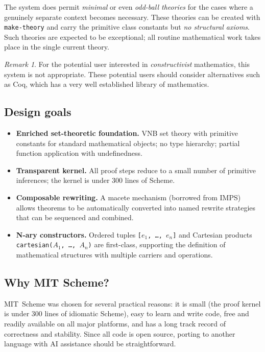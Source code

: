 \documentclass{amsbook}[openany]
\theoremstyle{definition}
\theoremstyle{remark}
\newtheorem{remark}{Remark}[chapter]
\theoremstyle{remark}
\begin{document}
The system does permit \emph{minimal} or even \emph{odd-ball theories}
for the cases where a genuinely separate context becomes necessary.
These theories can be created with \texttt{make-theory} and carry
the primitive class constants but \emph{no structural axioms}.  Such
theories are expected to be exceptional; all routine mathematical work
takes place in the single current theory.

\begin{remark}\label{remark:27137-61828-986360}
%
For the potential user interested in \emph{constructivist} mathematics,
this system is not appropriate. These potential users should consider
alternatives such as Coq, which has a very well established library of
mathematics.
%
\end{remark}

\subsection{Design goals}

\begin{itemize}[ label = $\circ$, leftmargin = 1cm]
\item \textbf{Enriched set-theoretic foundation.}  VNB set theory with
  primitive constants for standard mathematical objects; no type
  hierarchy; partial function application with undefinedness.
\item \textbf{Transparent kernel.}  All proof steps reduce to a small
number of
  primitive inferences; the kernel is under 300 lines of Scheme.
\item \textbf{Composable rewriting.}  A macete mechanism (borrowed from
  IMPS) allows theorems to be automatically converted into named rewrite
  strategies that can be sequenced and combined.
\item \textbf{N-ary constructors.}  Ordered tuples \texttt{[$e_1$,
  \ldots, $e_n$]} and Cartesian products \texttt{cartesian($A_1$, \ldots,
  $A_n$)} are first-class, supporting the definition of mathematical
  structures with multiple carriers and operations.
\end{itemize}

\subsection{Why MIT Scheme?}

MIT~Scheme was chosen for several practical reasons: it is small (the
proof kernel is under 300 lines of idiomatic Scheme), easy to learn
and write code, free and readily available on all major platforms, and has
a long track record of correctness and stability.  Since all code is
open source, porting to another language with AI assistance should be
straightforward.
\end{document}
